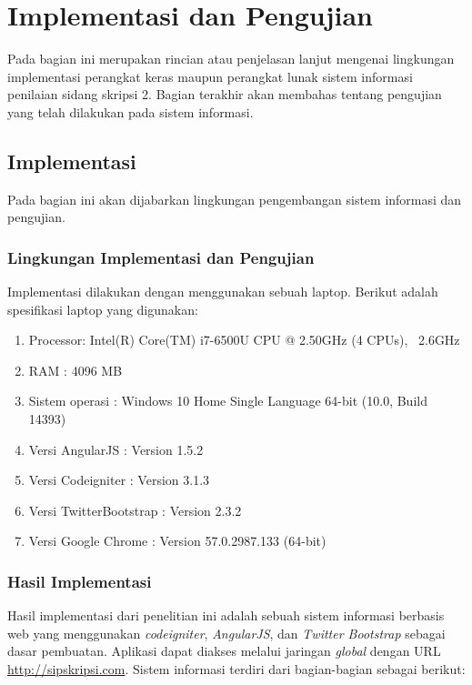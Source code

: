 \chapter{Implementasi dan Pengujian}
\label{chap: implemenPengujian}

Pada bagian ini merupakan rincian atau penjelasan lanjut mengenai lingkungan implementasi perangkat keras maupun perangkat lunak sistem informasi penilaian sidang skripsi 2. Bagian terakhir akan membahas tentang pengujian yang telah dilakukan pada sistem informasi.

\section{Implementasi}
\label{sec: implementasi}

	Pada bagian ini akan dijabarkan lingkungan pengembangan sistem informasi dan pengujian.
	
	\subsection{Lingkungan Implementasi dan Pengujian}
	\label{sub: lingkunganImp}
	
	Implementasi dilakukan dengan menggunakan sebuah laptop. Berikut adalah spesifikasi laptop
	yang digunakan:
	
	\begin{enumerate}
		\item Processor: Intel(R) Core(TM) i7-6500U CPU @ 2.50GHz (4 CPUs), ~2.6GHz
		\item RAM : 4096 MB
		\item Sistem operasi : Windows 10 Home Single Language 64-bit (10.0, Build 14393)
		\item Versi AngularJS : Version 1.5.2
		\item Versi Codeigniter : Version 3.1.3
		\item Versi TwitterBootstrap : Version 2.3.2
		\item Versi Google Chrome : Version 57.0.2987.133 (64-bit)
	\end{enumerate}

	\subsection{Hasil Implementasi}
	\label{sub: hasilImplemen}
	
	Hasil implementasi dari penelitian ini adalah sebuah sistem informasi berbasis web yang menggunakan \textit{codeigniter}, \textit{AngularJS}, dan \textit{Twitter Bootstrap} sebagai dasar pembuatan. Aplikasi dapat diakses melalui jaringan \textit{global} dengan URL \url{http://sipskripsi.com}. Sistem informasi terdiri dari bagian-bagian sebagai berikut:
	

